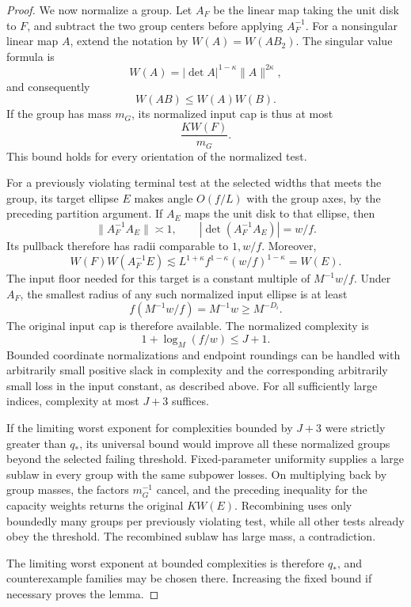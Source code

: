 \begin{proof}
We now normalize a group.  Let \(A_F\) be the linear map taking
the unit disk to \(F\), and subtract the two group centers
before applying \(A_F^{-1}\).  For a nonsingular linear map
\(A\), extend the notation by \(W(A)=W(AB_2)\).  The singular
value formula is
\[
W(A)=|\det A|^{1-\kappa}\|A\|^{2\kappa},
\]
and consequently
\begin{equation}\label{geo:submultiplicativity}
W(AB)\le W(A)W(B).
\end{equation}
If the group has mass \(m_G\), its normalized input cap is thus
at most
\[
\frac{KW(F)}{m_G}.
\]
This bound holds for every orientation of the normalized test.

For a previously violating terminal test at the selected widths
that meets the group, its target ellipse \(E\) makes angle
\(O(f/L)\) with the group axes, by the preceding partition argument.
If \(A_E\) maps the unit disk to that ellipse, then
\[
\|A_F^{-1}A_E\|\asymp1,
\qquad
|\det(A_F^{-1}A_E)|=w/f.
\]
Its pullback therefore has radii comparable to \(1,w/f\).
Moreover,
\[
W(F)W(A_F^{-1}E)
\lesssim
L^{1+\kappa}f^{1-\kappa}(w/f)^{1-\kappa}
=W(E).
\]
The input floor needed for this target is a constant multiple
of \(M^{-1}w/f\).  Under \(A_F\), the smallest radius of any
such normalized input ellipse is at least
\[
f(M^{-1}w/f)=M^{-1}w\ge M^{-D_i}.
\]
The original input cap is therefore available.  The normalized
complexity is
\[
1+\log_M(f/w)\le J+1.
\]
Bounded coordinate normalizations and endpoint roundings can
be handled with arbitrarily small positive slack in complexity
and the corresponding arbitrarily small loss in the input
constant, as described above.  For all sufficiently large
indices, complexity at most \(J+3\) suffices.

If the limiting worst exponent for complexities bounded by
\(J+3\) were strictly greater than \(q_*\), its universal bound
would improve all these normalized groups beyond the selected
failing threshold.  Fixed-parameter uniformity supplies a
large sublaw in every group with the same subpower losses.
On multiplying back by group masses, the factors \(m_G^{-1}\)
cancel, and the preceding inequality for the capacity weights
returns the original \(KW(E)\).  Recombining uses only boundedly
many groups per previously violating test, while all other
tests already obey the threshold.  The recombined sublaw has
large mass, a contradiction.

The limiting worst exponent at bounded complexities is
therefore \(q_*\), and counterexample families may be chosen
there.  Increasing the fixed bound if necessary proves the
lemma.
\end{proof}

